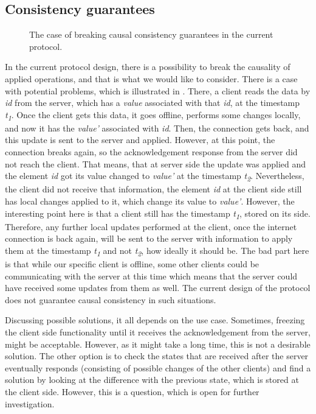 \subsection*{Consistency guarantees}

\begin{figure}[!htb]
    \begin{center}
    \def\svgwidth{\linewidth}
    
    \caption {The case of breaking causal consistency guarantees in the current protocol.}
    \label{fig:final}
\end{center}
\end{figure}

In the current protocol design, there is a possibility to break the causality of applied operations, and that is what we would like to consider. There is a case with potential problems, which is illustrated in . There, a client reads the data by \textit{id} from the server, which has a \textit{value} associated with that \textit{id}, at the timestamp \textit{t\textsubscript{1}}. Once the client gets this data, it goes offline, performs some changes locally, and now it has the \textit{value'} associated with \textit{id}. Then, the connection gets back, and this update is sent to the server and applied. However, at this point, the connection breaks again, so the acknowledgement response from the server did not reach the client. That means, that at server side the update was applied and the element \textit{id} got its value changed to \textit{value'} at the timestamp \textit{t\textsubscript{2}}. Nevertheless, the client did not receive that information, the element \textit{id} at the client side still has local changes applied to it, which change its value to \textit{value'}. However, the interesting point here is that a client still has the timestamp \textit{t\textsubscript{1}}, stored on its side. Therefore, any further local updates performed at the client, once the internet connection is back again, will be sent to the server with information to apply them at the timestamp \textit{t\textsubscript{1}} and not \textit{t\textsubscript{2}}, how ideally it should be. The bad part here is that while our specific client is offline, some other clients could be communicating with the server at this time which means that the server could have received some updates from them as well. The current design of the protocol does not guarantee causal consistency in such situations. 

Discussing possible solutions, it all depends on the use case. Sometimes, freezing the client side functionality until it receives the acknowledgement from the server, might be acceptable. However, as it might take a long time, this is not a desirable solution. The other option is to check the states that are received after the server eventually responds (consisting of possible changes of the other clients) and find a solution by looking at the difference with the previous state, which is stored at the client side. However, this is a question, which is open for further investigation.